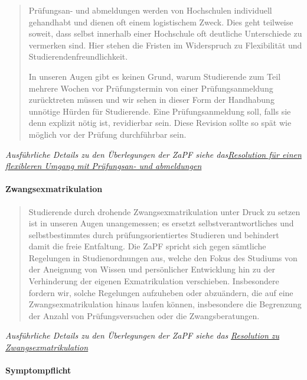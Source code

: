 \begin{quote}
Prüfungsan- und abmeldungen werden von Hochschulen individuell
gehandhabt und dienen oft einem logistischem Zweck. Dies geht teilweise
soweit, dass selbst innerhalb einer Hochschule oft deutliche
Unterschiede zu vermerken sind. Hier stehen die Fristen im Widerspruch
zu Flexibilität und Studierendenfreundlichkeit.

In unseren Augen gibt es keinen Grund, warum Studierende zum Teil
mehrere Wochen vor Prüfungstermin von einer Prüfungsanmeldung
zurücktreten müssen und wir sehen in dieser Form der Handhabung unnötige
Hürden für Studierende. Eine Prüfungsanmeldung soll, falls sie denn
explizit nötig ist, revidierbar sein. Diese Revision sollte so spät wie
möglich vor der Prüfung durchführbar sein.
\end{quote}

\emph{Ausführliche Details zu den Überlegungen der ZaPF siehe
das}\href{https://zapfev.de/resolutionen/sose18/Pruefungsanmeldung/reso_pruefungsanmeldung.pdf}{\emph{Resolution
für einen flexibleren Umgang mit Prüfungsan- und abmeldungen}}

\hypertarget{zwangsexmatrikulation}{%
\paragraph{Zwangsexmatrikulation}\label{zwangsexmatrikulation}}

\begin{quote}
Studierende durch drohende Zwangsexmatrikulation unter Druck zu setzen
ist in unseren Augen unangemessen; es ersetzt selbstverantwortliches und
selbstbestimmtes durch prüfungsorientiertes Studieren und behindert
damit die freie Entfaltung. Die ZaPF spricht sich gegen sämtliche
Regelungen in Studienordnungen aus, welche den Fokus des Studiums von
der Aneignung von Wissen und persönlicher Entwicklung hin zu der
Verhinderung der eigenen Exmatrikulation verschieben. Insbesondere
fordern wir, solche Regelungen aufzuheben oder abzuändern, die auf eine
Zwangsexmatrikulation hinaus laufen können, insbesondere die Begrenzung
der Anzahl von Prüfungsversuchen oder die Zwangsberatungen.
\end{quote}

\emph{Ausführliche Details zu den Überlegungen der ZaPF siehe das}
\href{https://zapfev.de/resolutionen/wise17/Zwangsexmatrikulation/Zwangsexmatrikulation.pdf}{\emph{Resolution
zu Zwangsexmatrikulation}}

\hypertarget{symptompflicht}{%
\paragraph{Symptompflicht}\label{symptompflicht}}

